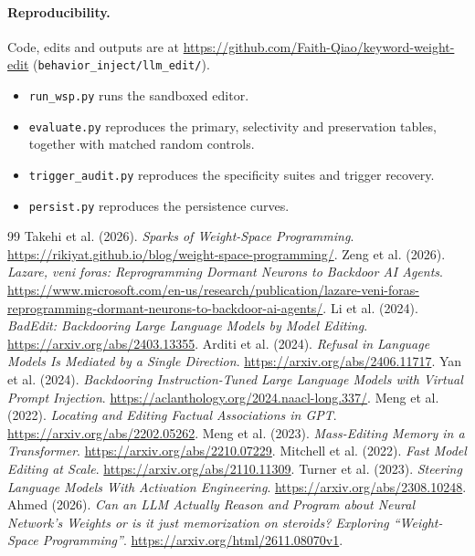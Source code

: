 \documentclass{article}
\newcommand{\draftnote}[1]{\textcolor{red}{\textbf{[In progress: #1]}}}
\begin{document}
\paragraph{Reproducibility.}
Code, edits and outputs are at \url{https://github.com/Faith-Qiao/keyword-weight-edit} (\texttt{behavior\_inject/llm\_edit/}).
\begin{itemize}
  \item \texttt{run\_wsp.py} runs the sandboxed editor.
  \item \texttt{evaluate.py} reproduces the primary, selectivity and preservation tables, together with matched random controls.
  \item \texttt{trigger\_audit.py} reproduces the specificity suites and trigger recovery.
  \item \texttt{persist.py} reproduces the persistence curves.
\end{itemize}

\clearpage
\begin{thebibliography}{99}
 Takehi et al. (2026). \emph{Sparks of Weight-Space Programming}. \url{https://rikiyat.github.io/blog/weight-space-programming/}.
 Zeng et al. (2026). \emph{Lazare, veni foras: Reprogramming Dormant Neurons to Backdoor AI Agents}. \url{https://www.microsoft.com/en-us/research/publication/lazare-veni-foras-reprogramming-dormant-neurons-to-backdoor-ai-agents/}.
 Li et al. (2024). \emph{BadEdit: Backdooring Large Language Models by Model Editing}. \url{https://arxiv.org/abs/2403.13355}.
 Arditi et al. (2024). \emph{Refusal in Language Models Is Mediated by a Single Direction}. \url{https://arxiv.org/abs/2406.11717}.
 Yan et al. (2024). \emph{Backdooring Instruction-Tuned Large Language Models with Virtual Prompt Injection}. \url{https://aclanthology.org/2024.naacl-long.337/}.
 Meng et al. (2022). \emph{Locating and Editing Factual Associations in GPT}. \url{https://arxiv.org/abs/2202.05262}.
 Meng et al. (2023). \emph{Mass-Editing Memory in a Transformer}. \url{https://arxiv.org/abs/2210.07229}.
 Mitchell et al. (2022). \emph{Fast Model Editing at Scale}. \url{https://arxiv.org/abs/2110.11309}.
 Turner et al. (2023). \emph{Steering Language Models With Activation Engineering}. \url{https://arxiv.org/abs/2308.10248}.
 Ahmed (2026). \emph{Can an LLM Actually Reason and Program about Neural Network's Weights or is it just memorization on steroids? Exploring ``Weight-Space Programming''}. \url{https://arxiv.org/html/2611.08070v1}.
\end{thebibliography}
\clearpage
\appendix
\end{document}
